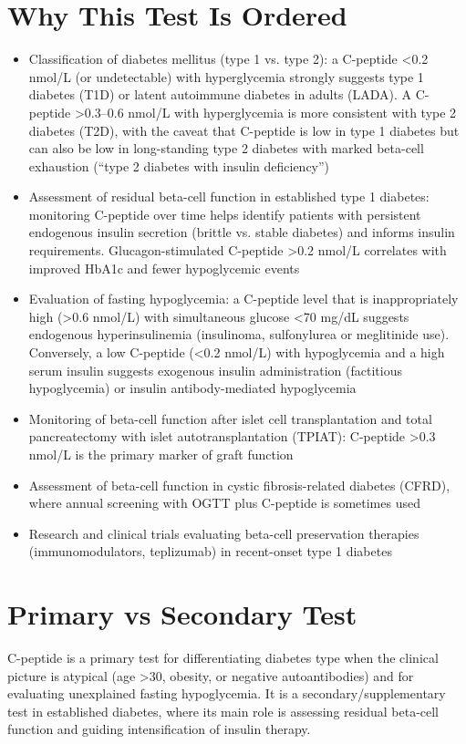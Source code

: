 \section*{Why This Test Is Ordered}
\begin{itemize}
  \item Classification of diabetes mellitus (type 1 vs. type 2): a C-peptide <0.2 nmol/L (or undetectable) with hyperglycemia strongly suggests type 1 diabetes (T1D) or latent autoimmune diabetes in adults (LADA). A C-peptide >0.3--0.6 nmol/L with hyperglycemia is more consistent with type 2 diabetes (T2D), with the caveat that C-peptide is low in type 1 diabetes but can also be low in long-standing type 2 diabetes with marked beta-cell exhaustion (``type 2 diabetes with insulin deficiency'')
  \item Assessment of residual beta-cell function in established type 1 diabetes: monitoring C-peptide over time helps identify patients with persistent endogenous insulin secretion (brittle vs. stable diabetes) and informs insulin requirements. Glucagon-stimulated C-peptide >0.2 nmol/L correlates with improved HbA1c and fewer hypoglycemic events
  \item Evaluation of fasting hypoglycemia: a C-peptide level that is inappropriately high (>0.6 nmol/L) with simultaneous glucose <70 mg/dL suggests endogenous hyperinsulinemia (insulinoma, sulfonylurea or meglitinide use). Conversely, a low C-peptide (<0.2 nmol/L) with hypoglycemia and a high serum insulin suggests exogenous insulin administration (factitious hypoglycemia) or insulin antibody-mediated hypoglycemia
  \item Monitoring of beta-cell function after islet cell transplantation and total pancreatectomy with islet autotransplantation (TPIAT): C-peptide >0.3 nmol/L is the primary marker of graft function
  \item Assessment of beta-cell function in cystic fibrosis-related diabetes (CFRD), where annual screening with OGTT plus C-peptide is sometimes used
  \item Research and clinical trials evaluating beta-cell preservation therapies (immunomodulators, teplizumab) in recent-onset type 1 diabetes
\end{itemize}

\section*{Primary vs Secondary Test}
C-peptide is a primary test for differentiating diabetes type when the clinical picture is atypical (age >30, obesity, or negative autoantibodies) and for evaluating unexplained fasting hypoglycemia. It is a secondary/supplementary test in established diabetes, where its main role is assessing residual beta-cell function and guiding intensification of insulin therapy.

